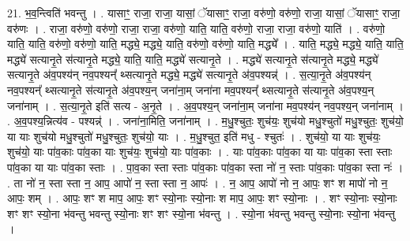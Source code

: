 \documentclass[17pt]{extarticle}
\begin{document}
21. भ॒व॒न्त्विति॑ भवन्तु । . यासाꣳ॒॒ राजा॒ राजा॒ यासां॒ ॅयासाꣳ॒॒ राजा॒ वरु॑णो॒ वरु॑णो॒ राजा॒ यासां॒ ॅयासाꣳ॒॒ राजा॒ वरु॑णः । . राजा॒ वरु॑णो॒ वरु॑णो॒ राजा॒ राजा॒ वरु॑णो॒ याति॒ याति॒ वरु॑णो॒ राजा॒ राजा॒ वरु॑णो॒ याति॑ । . वरु॑णो॒ याति॒ याति॒ वरु॑णो॒ वरु॑णो॒ याति॒ मद्ध्ये॒ मद्ध्ये॒ याति॒ वरु॑णो॒ वरु॑णो॒ याति॒ मद्ध्ये᳚ । . याति॒ मद्ध्ये॒ मद्ध्ये॒ याति॒ याति॒ मद्ध्ये॑ सत्यानृ॒ते स॑त्यानृ॒ते मद्ध्ये॒ याति॒ याति॒ मद्ध्ये॑ सत्यानृ॒ते । . मद्ध्ये॑ सत्यानृ॒ते स॑त्यानृ॒ते मद्ध्ये॒ मद्ध्ये॑ सत्यानृ॒ते अ॑व॒पश्य॑न् नव॒पश्यन्᳚ थ्सत्यानृ॒ते मद्ध्ये॒ मद्ध्ये॑ सत्यानृ॒ते अ॑व॒पश्यन्न्॑ । . स॒त्या॒नृ॒ते अ॑व॒पश्य॑न् नव॒पश्यन्᳚ थ्सत्यानृ॒ते स॑त्यानृ॒ते अ॑व॒पश्य॒न् जना॑ना॒म् जना॑ना मव॒पश्यन्᳚ थ्सत्यानृ॒ते स॑त्यानृ॒ते अ॑व॒पश्य॒न् जना॑नाम् । . स॒त्या॒नृ॒ते इति॑ सत्य - अ॒नृ॒ते । . अ॒व॒पश्य॒न् जना॑ना॒म् जना॑ना मव॒पश्य॑न् नव॒पश्य॒न् जना॑नाम् । . अ॒व॒पश्य॒न्नित्य॑व - पश्यन्न्॑ । . जना॑ना॒मिति॒ जना॑नाम् । . म॒धु॒श्चुतः॒ शुच॑यः॒ शुच॑यो मधु॒श्चुतो॑ मधु॒श्चुतः॒ शुच॑यो॒ या याः शुच॑यो मधु॒श्चुतो॑ मधु॒श्चुतः॒ शुच॑यो॒ याः । . म॒धु॒श्चुत॒ इति॑ मधु - श्चुतः॑ । . शुच॑यो॒ या याः शुच॑यः॒ शुच॑यो॒ याः पा॑व॒काः पा॑व॒का याः शुच॑यः॒ शुच॑यो॒ याः पा॑व॒काः । . याः पा॑व॒काः पा॑व॒का या याः पा॑व॒का स्ता स्ताः पा॑व॒का या याः पा॑व॒का स्ताः । . पा॒व॒का स्ता स्ताः पा॑व॒काः पा॑व॒का स्ता नो॑ न॒ स्ताः पा॑व॒काः पा॑व॒का स्ता नः॑ । . ता नो॑ न॒ स्ता स्ता न॒ आप॒ आपो॑ न॒ स्ता स्ता न॒ आपः॑ । . न॒ आप॒ आपो॑ नो न॒ आपः॒ शꣳ श मापो॑ नो न॒ आपः॒ शम् । . आपः॒ शꣳ श माप॒ आपः॒ शꣳ स्यो॒नाः स्यो॒नाः श माप॒ आपः॒ शꣳ स्यो॒नाः । . शꣳ स्यो॒नाः स्यो॒नाः शꣳ शꣳ स्यो॒ना भ॑वन्तु भवन्तु स्यो॒नाः शꣳ शꣳ स्यो॒ना भ॑वन्तु । . स्यो॒ना भ॑वन्तु भवन्तु स्यो॒नाः स्यो॒ना भ॑वन्तु । \newline
\end{document}
